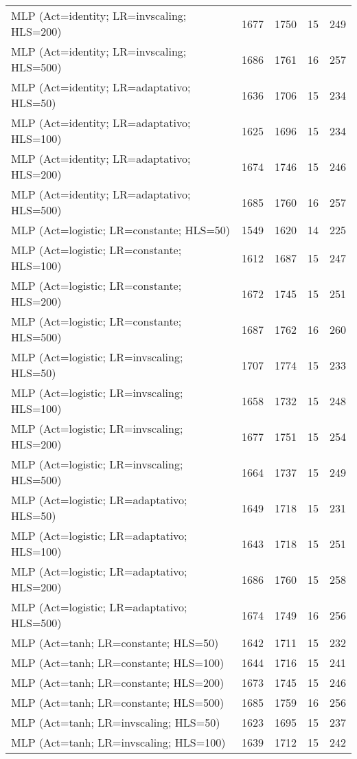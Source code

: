 \begin{center}
\begin{longtable}{|l|l|l|l|l|}
MLP (Act=identity; LR=invscaling; HLS=200) & 1677 & 1750 & 15 & 249 \\
MLP (Act=identity; LR=invscaling; HLS=500) & 1686 & 1761 & 16 & 257 \\
MLP (Act=identity; LR=adaptativo; HLS=50) & 1636 & 1706 & 15 & 234 \\
MLP (Act=identity; LR=adaptativo; HLS=100) & 1625 & 1696 & 15 & 234 \\
MLP (Act=identity; LR=adaptativo; HLS=200) & 1674 & 1746 & 15 & 246 \\
MLP (Act=identity; LR=adaptativo; HLS=500) & 1685 & 1760 & 16 & 257 \\
MLP (Act=logistic; LR=constante; HLS=50) & 1549 & 1620 & 14 & 225 \\
MLP (Act=logistic; LR=constante; HLS=100) & 1612 & 1687 & 15 & 247 \\
MLP (Act=logistic; LR=constante; HLS=200) & 1672 & 1745 & 15 & 251 \\
MLP (Act=logistic; LR=constante; HLS=500) & 1687 & 1762 & 16 & 260 \\
MLP (Act=logistic; LR=invscaling; HLS=50) & 1707 & 1774 & 15 & 233 \\
MLP (Act=logistic; LR=invscaling; HLS=100) & 1658 & 1732 & 15 & 248 \\
MLP (Act=logistic; LR=invscaling; HLS=200) & 1677 & 1751 & 15 & 254 \\
MLP (Act=logistic; LR=invscaling; HLS=500) & 1664 & 1737 & 15 & 249 \\
MLP (Act=logistic; LR=adaptativo; HLS=50) & 1649 & 1718 & 15 & 231 \\
MLP (Act=logistic; LR=adaptativo; HLS=100) & 1643 & 1718 & 15 & 251 \\
MLP (Act=logistic; LR=adaptativo; HLS=200) & 1686 & 1760 & 15 & 258 \\
MLP (Act=logistic; LR=adaptativo; HLS=500) & 1674 & 1749 & 16 & 256 \\
MLP (Act=tanh; LR=constante; HLS=50) & 1642 & 1711 & 15 & 232 \\
MLP (Act=tanh; LR=constante; HLS=100) & 1644 & 1716 & 15 & 241 \\
MLP (Act=tanh; LR=constante; HLS=200) & 1673 & 1745 & 15 & 246 \\
MLP (Act=tanh; LR=constante; HLS=500) & 1685 & 1759 & 16 & 256 \\
MLP (Act=tanh; LR=invscaling; HLS=50) & 1623 & 1695 & 15 & 237 \\
MLP (Act=tanh; LR=invscaling; HLS=100) & 1639 & 1712 & 15 & 242 \\

\end{longtable}
\end{center}
